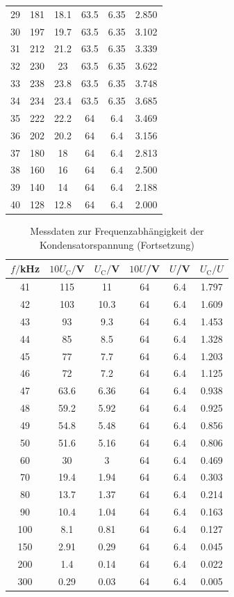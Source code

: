 \begin{table}
\begin{tabular}{c c c c c c}
 29	  & 181	   & 18.1  & 63.5 & 6.35& 2.850 \\
 30	  & 197	   & 19.7  & 63.5 & 6.35& 3.102 \\
 31	  & 212	   & 21.2  & 63.5 & 6.35& 3.339 \\
 32	  & 230	   & 23    & 63.5 & 6.35& 3.622 \\
 33	  & 238	   & 23.8  & 63.5 & 6.35& 3.748 \\
 34	  & 234	   & 23.4  & 63.5 & 6.35& 3.685 \\
 35	  & 222	   & 22.2  & 64   & 6.4 & 3.469 \\
 36	  & 202	   & 20.2  & 64   & 6.4 & 3.156 \\
 37	  & 180	   & 18    & 64   & 6.4 & 2.813 \\
 38	  & 160	   & 16    & 64   & 6.4 & 2.500 \\
 39	  & 140	   & 14    & 64   & 6.4 & 2.188 \\
 40	  & 128	   & 12.8  & 64   & 6.4 & 2.000 \\
\bottomrule
\end{tabular}
\end{table}

\begin{table}
\centering
\caption{Messdaten zur Frequenzabhängigkeit der Kondensatorspannung (Fortsetzung)}
\label{tab:amplitude2}
\begin{tabular}{c c c c c c}
\toprule
$f/$kHz & $10U_\mathrm{C}/$V & $U_\mathrm{C}/$V & $10U$/V & $U$/V & $U_\mathrm{C}/U$ \\
\midrule
 41	  & 115	   & 11    & 64   & 6.4 & 1.797 \\
 42	  & 103	   & 10.3  & 64   & 6.4 & 1.609 \\
 43	  &  93	   &  9.3  & 64   & 6.4 & 1.453 \\
 44	  &  85	   &  8.5  & 64   & 6.4 & 1.328 \\
 45	  &  77	   &  7.7  & 64   & 6.4 & 1.203 \\
 46	  &  72	   &  7.2  & 64   & 6.4 & 1.125 \\
 47	  &  63.6  &  6.36 & 64   & 6.4 & 0.938 \\
 48	  &  59.2  &  5.92 & 64   & 6.4 & 0.925 \\
 49	  &  54.8	 &  5.48 & 64   & 6.4 & 0.856 \\
 50	  &  51.6	 &  5.16 & 64   & 6.4 & 0.806 \\
 60	  &  30	   &  3    & 64   & 6.4 & 0.469 \\
 70	  &  19.4	 &  1.94 & 64   & 6.4 & 0.303 \\
 80	  &  13.7	 &  1.37 & 64   & 6.4 & 0.214 \\
 90	  &  10.4	 &  1.04 & 64   & 6.4 & 0.163 \\
100 	&   8.1	 &  0.81 & 64   & 6.4 & 0.127 \\
150	  &   2.91 &	0.29 & 64   & 6.4 & 0.045 \\
200	  &   1.4	 &  0.14 & 64   & 6.4 & 0.022 \\
300	  &   0.29 &	0.03 & 64   & 6.4 & 0.005 \\
\bottomrule
\end{tabular}
\end{table}


